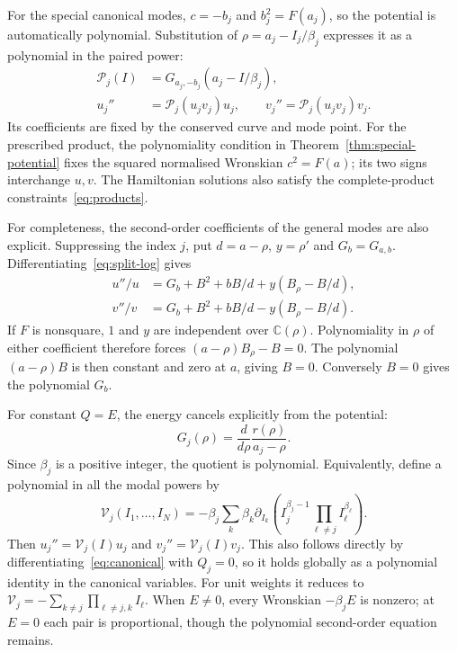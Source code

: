 \documentclass[11pt]{article}
\begin{document}
For the special canonical modes, $c=-b_j$ and $b_j^2=F(a_j)$, so the
potential is automatically polynomial. Substitution of
$\rho=a_j-I_j/\beta_j$ expresses it as a polynomial in the paired power:
\begin{equation}\label{eq:special-self-generating}
 \begin{aligned}
 \mathcal P_j(I)&=G_{a_j,-b_j}(a_j-I/\beta_j),\\
 u_j''&=\mathcal P_j(u_jv_j)u_j,\qquad
 v_j''=\mathcal P_j(u_jv_j)v_j.
 \end{aligned}
\end{equation}
Its coefficients are fixed by the conserved curve and mode point.
For the prescribed product, the polynomiality condition in
Theorem~\ref{thm:special-potential} fixes the squared normalised Wronskian
$c^2=F(a)$; its two signs interchange $u,v$. The Hamiltonian solutions also satisfy the
complete-product constraints~\eqref{eq:products}.

For completeness, the second-order coefficients of the general modes are
also explicit. Suppressing the index $j$, put $d=a-\rho$, $y=\rho'$ and
$G_b=G_{a,b}$. Differentiating~\eqref{eq:split-log} gives
\begin{equation}\label{eq:special-general-second}
 \begin{aligned}
 u''/u&=G_b+B^2+bB/d+y(B_\rho-B/d),\\
 v''/v&=G_b+B^2+bB/d-y(B_\rho-B/d).
 \end{aligned}
\end{equation}
If $F$ is nonsquare, $1$ and $y$ are independent over $\mathbb C(\rho)$.
Polynomiality in $\rho$ of either coefficient therefore forces
$(a-\rho)B_\rho-B=0$. The polynomial $(a-\rho)B$ is then constant and
zero at $a$, giving $B=0$. Conversely $B=0$ gives the polynomial $G_b$.

For constant $Q=E$, the energy cancels explicitly from the potential:
\begin{equation}\label{eq:special-constant-potential}
 G_j(\rho)=\frac{d}{d\rho}\frac{r(\rho)}{a_j-\rho}.
\end{equation}
Since $\beta_j$ is a positive integer, the quotient is polynomial.
Equivalently, define a polynomial in all the modal powers by
\begin{equation}\label{eq:special-global-potential}
 \mathcal V_j(I_1,\ldots,I_N)
 =-\beta_j\sum_k\beta_k\partial_{I_k}
          \left(I_j^{\beta_j-1}\prod_{\ell\ne j}I_\ell^{\beta_\ell}\right).
\end{equation}
Then $u_j''=\mathcal V_j(I)u_j$ and $v_j''=\mathcal V_j(I)v_j$.
This also follows directly by differentiating~\eqref{eq:canonical} with
$Q_j=0$, so it holds globally as a polynomial identity in the canonical
variables. For unit weights it reduces to
$\mathcal V_j=-\sum_{k\ne j}\prod_{\ell\ne j,k}I_\ell$.
When $E\ne0$, every Wronskian $-\beta_jE$ is nonzero; at $E=0$ each
pair is proportional, though the polynomial second-order equation remains.
\end{document}
